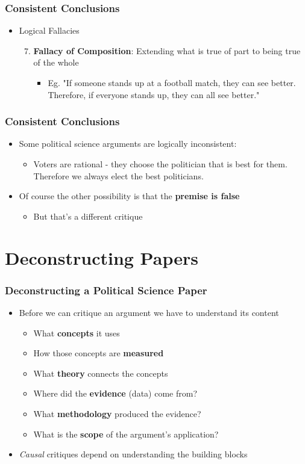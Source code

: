 \documentclass[xcolor=x11names,compress]{beamer}\usepackage[]{graphicx}\usepackage[]{color}
\renewcommand{\(}{\begin{columns}}
\renewcommand{\)}{\end{columns}}
\newcommand{\<}[1]{\begin{column}{#1}}
\renewcommand{\>}{\end{column}}
\begin{document}
\begin{frame}
\frametitle{Consistent Conclusions}
\begin{itemize}
\item Logical Fallacies
\begin{enumerate}
\setcounter{enumi}{6}
\item \textbf{Fallacy of Composition}: Extending what is true of part to being true of the whole
\pause
\begin{itemize}
\item Eg. "If someone stands up at a football match, they can see better. Therefore, if everyone stands up, they can all see better."
\end{itemize}
\end{enumerate}
\end{itemize}
\end{frame}

\begin{frame}
\frametitle{Consistent Conclusions}
\begin{itemize}
\item Some political science arguments are logically inconsistent:
\begin{itemize}
\item Voters are rational - they choose the politician that is best for them. Therefore we always elect the best politicians.
\end{itemize}
\pause
\item Of course the other possibility is that the \textbf{premise is false}
\begin{itemize}
\item But that's a different critique
\end{itemize}
\end{itemize}
\end{frame}

\section{Deconstructing Papers}

\begin{frame}
\frametitle{Deconstructing a Political Science Paper}
\begin{itemize}
\item Before we can critique an argument we have to understand its content
\pause
\begin{itemize}
\item What \textbf{concepts} it uses
\pause
\item How those concepts are \textbf{measured}
\pause
\item What \textbf{theory} connects the concepts
\pause
\item Where did the \textbf{evidence} (data) come from?
\pause
\item What \textbf{methodology} produced the evidence?
\pause
\item What is the \textbf{scope} of the argument's application?
\end{itemize}
\item \textit{Causal} critiques depend on understanding the building blocks
\end{itemize}
\end{frame}
\end{document}
